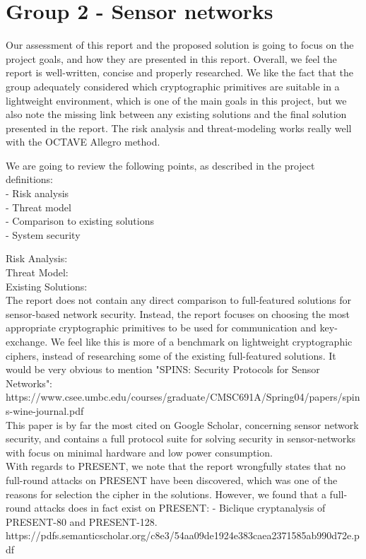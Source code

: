 
\section{Group 2 - Sensor networks}

Our assessment of this report and the proposed solution is going to focus on the project goals, and how they are presented in this report.
Overall, we feel the report is well-written, concise and properly researched. We like the fact that the group adequately considered which cryptographic primitives are suitable in a lightweight environment, which is one of the main goals in this project, but we also note the missing link between any existing solutions and the final solution presented in the report.
The risk analysis and threat-modeling works really well with the OCTAVE Allegro method.

We are going to review the following points, as described in the project definitions:
\\- Risk analysis
\\- Threat model
\\- Comparison to existing solutions
\\- System security

Risk Analysis:\\

Threat Model:\\

Existing Solutions:\\
The report does not contain any direct comparison to full-featured solutions for sensor-based network security. Instead, the report focuses on choosing the most appropriate cryptographic primitives to be used for communication and key-exchange. We feel like this is more of a benchmark on lightweight cryptographic ciphers, instead of researching some of the existing full-featured solutions.
It would be very obvious to mention "SPINS: Security Protocols for Sensor Networks":\\
https://www.csee.umbc.edu/courses/graduate/CMSC691A/Spring04/papers/spins-wine-journal.pdf
\\This paper is by far the most cited on Google Scholar, concerning sensor network security, and contains a full protocol suite for solving security in sensor-networks with focus on minimal hardware and low power consumption.\\

With regards to PRESENT, we note that the report wrongfully states that no full-round attacks on PRESENT have been discovered, which was one of the reasons for selection the cipher in the solutions. However, we found that a full-round attacks does in fact exist on PRESENT:
- Biclique cryptanalysis of PRESENT-80 and PRESENT-128.\\ https://pdfs.semanticscholar.org/c8e3/54aa09de1924e383caea2371585ab990d72e.pdf

